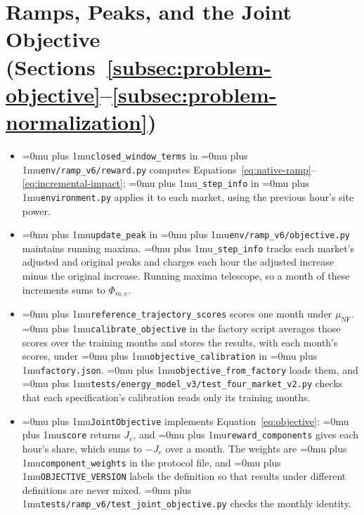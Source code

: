 \documentclass{UNCC-thesis}
\newcommand{\codepath}[1]{{\Urlmuskip=0mu plus 1mu\relax\nolinkurl{#1}}}
\begin{document}
\section{Ramps, Peaks, and the Joint Objective
  (Sections~\ref{subsec:problem-objective}--\ref{subsec:problem-normalization})}
\begin{itemize}
  \item \codepath{closed_window_terms} in \codepath{env/ramp_v6/reward.py}
        computes Equations~\eqref{eq:native-ramp}--\eqref{eq:incremental-impact};
        \codepath{_step_info} in \codepath{environment.py} applies it to each
        market, using the previous hour's site power.
  \item \codepath{update_peak} in \codepath{env/ramp_v6/objective.py}
        maintains running maxima. \codepath{_step_info} tracks each market's
        adjusted and original peaks and charges each hour the adjusted increase
        minus the original increase. Running maxima telescope, so a month of
        these increments sums to \(\Phi_{m,e}\).
  \item \codepath{reference_trajectory_scores} scores one month under
        \(\mu_{\mathrm{NF}}\). \codepath{calibrate_objective} in the factory
        script averages those scores over the training months and stores the
        results, with each month's scores, under
        \codepath{objective_calibration} in \codepath{factory.json}.
        \codepath{objective_from_factory} loads them, and
        \codepath{tests/energy_model_v3/test_four_market_v2.py} checks that
        each specification's calibration reads only its training months.
  \item \codepath{JointObjective} implements
        Equation~\eqref{eq:objective}: \codepath{score} returns \(J_e\), and
        \codepath{reward_components} gives each hour's share, which sums to
        \(-J_e\) over a month. The weights are \codepath{component_weights} in
        the protocol file, and \codepath{OBJECTIVE_VERSION} labels the
        definition so that results under different definitions are never
        mixed. \codepath{tests/ramp_v6/test_joint_objective.py} checks the
        monthly identity.
\end{itemize}
\end{document}
